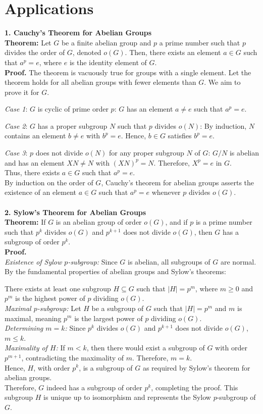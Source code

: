 \section{Applications}
\textbf{1. Cauchy's Theorem for Abelian Groups}\\
\textbf{Theorem:}
Let $G$ be a finite abelian group and $p$ a prime number such that $p$ divides the order of $G$, denoted $o(G)$. Then, there exists an element $a \in G$ such that $a^p = e$, where $e$ is the identity element of $G$.
\\
\textbf{Proof.}
The theorem is vacuously true for groups with a single element.
Let the theorem holds for all abelian groups with fewer elements than $G$. We aim to prove it for $G$.

\textit{Case 1}: $G$ is cyclic of prime order $p$:
    $G$ has an element $a \neq e$ such that $a^p = e$.
    
\textit{Case 2}: $G$ has a proper subgroup $N$ such that $p$ divides $o(N)$:
    By induction, $N$ contains an element $b \neq e$ with $b^p = e$. Hence, $b \in G$ satisfies $b^p = e$.
    
\textit{Case 3}: $p$ does not divide $o(N)$ for any proper subgroup $N$ of $G$:
    $G/N$ is abelian and has an element $XN \neq N$ with $(XN)^p = N$. Therefore, $X^p = e$ in $G$.\\
Thus, there exists $a \in G$ such that $a^p = e$.
\\
By induction on the order of $G$, Cauchy's theorem for abelian groups asserts the existence of an element $a \in G$ such that $a^p = e$ whenever $p$ divides $o(G)$.
\\\\
\textbf{2. Sylow's Theorem for Abelian Groups}
\\
\textbf{Theorem:} If $G$ is an abelian group of order $o(G)$, and if $p$ is a prime number such that $p^k$ divides $o(G)$ and $p^{k+1}$ does not divide $o(G)$, then $G$ has a subgroup of order $p^k$.
\\
\textbf{Proof.}
\\
\textit{Existence of Sylow $p$-subgroup:}
   Since $G$ is abelian, all subgroups of $G$ are normal. By the fundamental properties of abelian groups and Sylow's theorems:

   There exists at least one subgroup $H \subseteq G$ such that $|H| = p^m$, where $m \geq 0$ and $p^m$ is the highest power of $p$ dividing $o(G)$.
\\
\textit{Maximal $p$-subgroup:}
   Let $H$ be a subgroup of $G$ such that $|H| = p^m$ and $m$ is maximal, meaning $p^m$ is the largest power of $p$ dividing $o(G)$.
\\
\textit{Determining $m = k$:}
Since $p^k$ divides $o(G)$ and $p^{k+1}$ does not divide $o(G)$, $m \leq k$.
\\
\textit{Maximality of $H$:}
   If $m < k$, then there would exist a subgroup of $G$ with order $p^{m+1}$, contradicting the maximality of $m$. Therefore, $m = k$.
\\
   Hence, $H$, with order $p^k$, is a subgroup of $G$ as required by Sylow's theorem for abelian groups.
\\
Therefore, $G$ indeed has a subgroup of order $p^k$, completing the proof. This subgroup $H$ is unique up to isomorphism and represents the Sylow $p$-subgroup of $G$.
